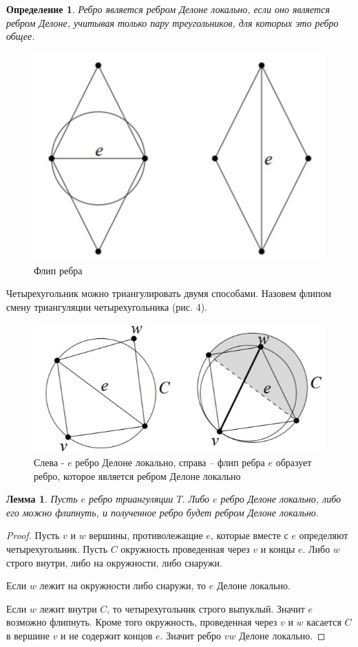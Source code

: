 \documentclass{fefu}
\newtheorem{definition}{Определение}
\newtheorem{lemma}{Лемма}
\begin{document}
\begin{definition}
    Ребро является ребром Делоне локально, если оно является ребром Делоне, учитывая только пару треугольников, для
    которых это ребро общее.
\end{definition}
\begin{figure}[H]
    \centering
    \includegraphics{images/Flip.jpg}
    \caption{Флип ребра}
\end{figure}
Четырехугольник можно триангулировать двумя способами. Назовем флипом смену триангуляции четырехугольника (рис. 4).

\begin{figure}[H]
    \centering
    \includegraphics{images/FlipLemma.jpg}
    \caption{Слева - $e$ ребро Делоне локально, справа -- флип ребра $e$ образует ребро, которое является ребром Делоне
    локально}
\end{figure}
\begin{lemma}
    Пусть $e$ ребро триангуляции $T$. Либо $e$ ребро Делоне локально, либо его можно флипнуть, и полученное ребро будет
    ребром Делоне локально.
\end{lemma}
\begin{proof}
    Пусть $v$ и $w$ вершины, противолежащие $e$, которые вместе с $e$ определяют четырехугольник. Пусть $C$ окружность
    проведенная через $v$ и концы $e$. Либо $w$ строго внутри, либо на окружности, либо снаружи.

    Если $w$ лежит на окружности либо снаружи, то $e$ Делоне локально.

    Если $w$ лежит внутри $C$, то четырехугольник строго выпуклый. Значит $e$ возможно флипнуть. Кроме того окружность,
    проведенная через $v$ и $w$ касается $C$ в вершине $v$ и не содержит концов $e$. Значит ребро $vw$ Делоне локально.
\end{proof}
\end{document}
